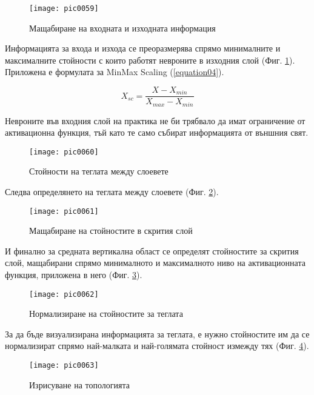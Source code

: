 \begin{figure}[h]
  \centering
  \texttt{[image: pic0059]}
  \caption{Мащабиране на входната и изходната информация}
\label{fig:pic0059}
\end{figure}
\FloatBarrier

Информацията за входа и изхода се преоразмерява спрямо минималните и максималните стойности с които работят невроните в изходния слой (Фиг. \ref{fig:pic0059}). Приложена е формулата за MinMax Scaling (\ref{equation04}). 

\begin{equation}
\label{equation04}
X_{sc} = \frac{X-X_{min}}{X_{max}-X_{min}}
\end{equation}

Невроните във входния слой на практика не би трябвало да имат ограничение от активационна функция, тъй като те само събират информацията от външния свят. 

\begin{figure}[h]
  \centering
  \texttt{[image: pic0060]}
  \caption{Стойности на теглата между слоевете}
\label{fig:pic0060}
\end{figure}
\FloatBarrier

Следва определянето на теглата между слоевете (Фиг. \ref{fig:pic0060}).

\begin{figure}[h]
  \centering
  \texttt{[image: pic0061]}
  \caption{Мащабиране на стойностите в скрития слой}
\label{fig:pic0061}
\end{figure}
\FloatBarrier

И финално за средната вертикална област се определят стойностите за скрития слой, мащабирани спрямо минималното и максималното ниво на активационната функция, приложена в него (Фиг. \ref{fig:pic0061}).

\begin{figure}[h]
  \centering
  \texttt{[image: pic0062]}
  \caption{Нормализиране на стойностите за теглата}
\label{fig:pic0062}
\end{figure}
\FloatBarrier

За да бъде визуализирана информацията за теглата, е нужно стойностите им да се нормализират спрямо най-малката и най-голямата стойност измежду тях (Фиг. \ref{fig:pic0062}).

\begin{figure}[h]
  \centering
  \texttt{[image: pic0063]}
  \caption{Изрисуване на топологията}
\label{fig:pic0063}
\end{figure}
\FloatBarrier

